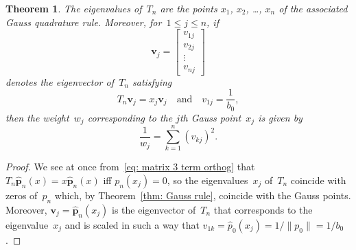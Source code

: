 \documentclass[12pt,a4paper]{article}
\newtheorem{theorem}{Theorem}
\newcommand{\hatvecp}{\hat{\boldsymbol{p}}}
\begin{document}
\begin{theorem}\label{thm: Jacobi eigenproblem}
The eigenvalues of~$T_n$ are the points $x_1$, $x_2$, \dots, $x_n$
of the associated Gauss quadrature rule.  Moreover, for~$1\le j\le n$,
if
\[
\boldsymbol{v}_j=\begin{bmatrix}v_{1j}\\ v_{2j}\\ \vdots\\ v_{nj}
\end{bmatrix}
\]
denotes the eigenvector of~$T_n$ satisfying
\[
T_n\boldsymbol{v}_j=x_j\boldsymbol{v}_j
\quad\text{and}\quad
v_{1j}=\frac{1}{b_0},
\]
then the weight~$w_j$ corresponding to the $j$th Gauss point~$x_j$ 
is given by
\[
\frac{1}{w_j}=\sum_{k=1}^n(v_{kj})^2.
\]
\end{theorem}
\begin{proof}
We see at once from~\eqref{eq: matrix 3 term orthog} that 
$T_n\hatvecp_n(x)=x\hatvecp_n(x)$ iff $p_n(x_j)=0$, so the
eigenvalues~$x_j$ of~$T_n$ coincide with zeros of~$p_n$ which,
by Theorem~\ref{thm: Gauss rule}, coincide with the Gauss points.  
Moreover, $\boldsymbol{v}_j=\hatvecp_n(x_j)$ is the eigenvector 
of~$T_n$ that corresponds to the eigenvalue~$x_j$ and is scaled in 
such a way that $v_{1k}=\hat p_0(x_j)=1/\|p_0\|=1/b_0$.


\end{proof}
\end{document}
